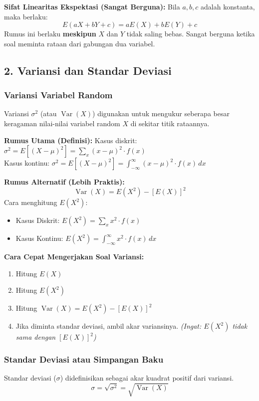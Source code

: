 \documentclass[12pt, a4paper]{article}
\begin{document}
\textbf{Sifat Linearitas Ekspektasi (Sangat Berguna):}
Bila $a, b, c$ adalah konstanta, maka berlaku:
$$\boxed{E(aX + bY + c) = aE(X) + bE(Y) + c}$$
Rumus ini berlaku \textbf{meskipun} $X$ dan $Y$ tidak saling bebas. Sangat berguna ketika soal meminta rataan dari gabungan dua variabel.

\subsection{2. Variansi dan Standar Deviasi}
\subsubsection{Variansi Variabel Random}
Variansi $\sigma^2$ (atau $\operatorname{Var}(X)$) digunakan untuk mengukur seberapa besar keragaman nilai-nilai variabel random $X$ di sekitar titik rataannya.

\textbf{Rumus Utama (Definisi):}
Kasus diskrit: $\sigma^2 = E[(X - \mu)^2] = \sum_{x} (x - \mu)^2 \cdot f(x)$ \\
Kasus kontinu: $\sigma^2 = E[(X - \mu)^2] = \int_{-\infty}^{\infty} (x - \mu)^2 \cdot f(x) \, dx$

\textbf{Rumus Alternatif (Lebih Praktis):}
$$\operatorname{Var}(X) = E(X^2) - [E(X)]^2$$
Cara menghitung $E(X^2)$:
\begin{itemize}
    \item Kasus Diskrit: $E(X^2) = \sum_{x} x^2 \cdot f(x)$
    \item Kasus Kontinu: $E(X^2) = \int_{-\infty}^{\infty} x^2 \cdot f(x) \, dx$
\end{itemize}

\textbf{Cara Cepat Mengerjakan Soal Variansi:}
\begin{enumerate}
    \item Hitung $E(X)$
    \item Hitung $E(X^2)$
    \item Hitung $\operatorname{Var}(X) = E(X^2) - [E(X)]^2$
    \item Jika diminta standar deviasi, ambil akar variansinya. \textit{(Ingat: $E(X^2)$ tidak sama dengan $[E(X)]^2$)}
\end{enumerate}

\subsubsection{Standar Deviasi atau Simpangan Baku}
Standar deviasi ($\sigma$) didefinisikan sebagai akar kuadrat positif dari variansi.
$$\sigma = \sqrt{\sigma^2} = \sqrt{\operatorname{Var}(X)}$$
\end{document}
